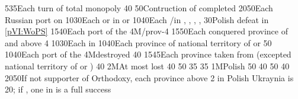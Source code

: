 %
%
%
{5}{35}{Each turn of total  monopoly}%
%
%
{}{40}{}%
%
%
{}{50}{Contruction of  completed}%
%
%
{20}{50}{Each Russian port on }%
%
%
{10}{30}{Each \COL or \TP in  or }%
%
%
%
{10}{40}{Each \COL/\TP in \granderegionAmour, \granderegionBaikal,
  \granderegionAfghanistan, \granderegionPerse, \continentIndia}%
%
%
{}{30}{Polish defeat in \ref{pVI:WoPS}}%
%
%
{15}{40}{Each port of the \regionBaltique}%
%
\EUobjective4M{\payscrimee/\paysmoldavie}{prov-4}%
{15}{50}{Each conquered province of  and  above
  4}%
%
%
%
{10}{30}{Each \COL in \granderegionAlaska}%
%
%
%
{10}{40}{Each province of national territory of \paysgeorgie or \paysperse}%
%
%
{}{50}{}%
%
%
{10}{40}{Each port of the \regionBaltique}%
%
\EUobjective4M{\payscrimee destroyed}{}%
{}{40}{}%
%
%
{15}{45}{Each province taken from \paysmajeurTurquie (excepted national
  territory of \paysgeorgie or \paysperse)}%
%
 
%
%
{}{40}{}%
%
\EUobjective2M{At most \provinceSmolenska lost}{}%
{}{40}{}%
%
%
{}{50}{}%
%
%
{}{35}{}%
%
%
{}{35}{}%
%
%
\EUobjective1M{Polish \provinceSmolenska}{}%
{}{50}{}%
%
%
{}{40}{}%
%
%
{}{50}{}%
%
%
{}{40}{}%
%
%
{20}{50}{If not supporter of Orthodoxy, each province above 2 in Polish
  Ukraynia is 20\VPs; if \Xorthodoxe, one \COL in \continentSiberia is a full
  success}%
